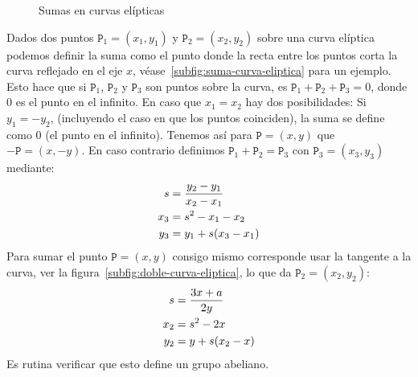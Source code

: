   \begin{figure}
    \centering
    \hspace{1em}%
    \caption{Sumas en curvas elípticas}
    \label{fig:sumas-curva-eliptica}
  \end{figure}
  Dados dos puntos \(\mathtt{P}_1 = (x_1, y_1)\)
  y \(\mathtt{P}_2 = (x_2, y_2)\) sobre una curva elíptica
  podemos definir la suma
  como el punto donde la recta entre los puntos corta la curva
  reflejado en el eje \(x\),
  véase~\ref{subfig:suma-curva-eliptica} para un ejemplo.
  Esto hace que si \(\mathtt{P}_1\),
  \(\mathtt{P}_2\) y \(\mathtt{P}_3\)
  son puntos sobre la curva,
  es \(\mathtt{P}_1 + \mathtt{P}_2 + \mathtt{P}_3 = 0\),
  donde 0 es el punto en el infinito.
  En caso que \(x_1 = x_2\)
  hay dos posibilidades:
  Si \(y_1 = - y_2\),
  (incluyendo el caso en que los puntos coinciden),
  la suma se define como \(0\)
  (el punto en el infinito).
  Tenemos así para \(\mathtt{P} = (x, y)\)
  que \(- \mathtt{P} = (x, -y)\).
  En caso contrario
  definimos \(\mathtt{P}_1 + \mathtt{P}_2 = \mathtt{P}_3\)
  con \(\mathtt{P}_3 = (x_3, y_3)\)
  mediante:
  \begin{align}
    s
      &= \frac{y_2 - y_1}{x_2 - x_1} \notag \\
    x_3
      &= s^2 - x_1 - x_2 \label{eq:suma-curva-eliptica} \\
    y_3
      &= y_1 + s (x_3 - x_1) \notag
  \end{align}
  Para sumar el punto \(\mathtt{P} = (x, y)\) consigo mismo
  corresponde usar la tangente a la curva,
  ver la figura~\ref{subfig:doble-curva-eliptica},
  lo que da \(\mathtt{P}_2 = (x_2, y_2)\):
  \begin{align}
    s
      &= \frac{3 x + a}{2 y} \notag \\
    x_2
      &= s^2 - 2 x \label{eq:doble-curva-eliptica} \\
    y_2
      &= y + s (x_2 - x) \notag
  \end{align}
  Es rutina verificar que esto define un grupo abeliano.%

